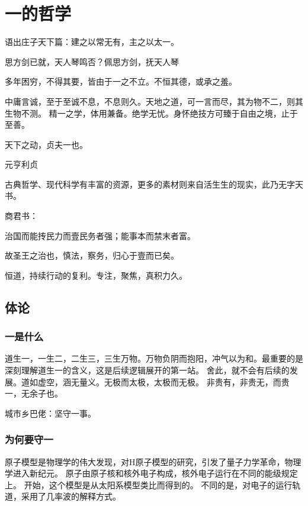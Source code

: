 \chapter{一的哲学}

语出庄子天下篇：建之以常无有，主之以太一。

思方剑已就，天人琴鸣否？佩思方剑，抚天人琴

多年困穷，不得其要，皆由于一之不立。不恒其德，或承之羞。

中庸言诚，至于至诚不息，不息则久。天地之道，可一言而尽，其为物不二，则其生物不测。
精一之学，体用兼备。绝学无忧。身怀绝技方可臻于自由之境，止于至善。

天下之动，贞夫一也。

元亨利贞

古典哲学、现代科学有丰富的资源，更多的素材则来自活生生的现实，此乃无字天书。

商君书：
\begin{shadequote}

治国而能抟民力而壹民务者强；能事本而禁末者富。

故圣王之治也，慎法，察务，归心于壹而已矣。
\end{shadequote}

恒道，持续行动的复利。专注，聚焦，真积力久。

\section{体论}

\subsection{一是什么}

道生一，一生二，二生三，三生万物。万物负阴而抱阳，冲气以为和。最重要的是深刻理解道生一的含义，这是后续逻辑展开的第一站。
舍此，就不会有后续的发展。道如虚空，涵无量义。无极而太极，太极而无极。
非贵有，非贵无，而贵一，无余子也。

城市乡巴佬：坚守一事。

\subsection{为何要守一}

原子模型是物理学的伟大发现，对H原子模型的研究，引发了量子力学革命，物理学进入新纪元。
原子由原子核和核外电子构成，核外电子运行在不同的能级规定上。
开始，这个模型是从太阳系模型类比而得到的。
不同的是，对电子的运行轨道，采用了几率波的解释方式。

